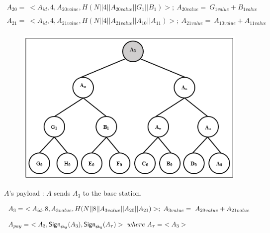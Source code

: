\documentclass[%
  slidesonly,%
  semlayer%
  ]{seminar}                                  %
\newcommand{\sk}{\sf{sk}}
\begin{document}
\begin{slide}
      \begin{tiny}
        \begin{equation*}
          \begin{array}{l}
            A_{20} =\ <A_{id},4,A_{20value},H(N||4||A_{20value}||G_{1}||B_{1})>;\ A_{20value} =\ G_{1value} + B_{1value}\\ 
            \\
            A_{21} =\ <A_{id},4,A_{21value},H(N||4||A_{21value}||A_{10}||A_{11})>;\ A_{21value} =\ A_{10value} + A_{11value}\\ 
          \end{array}
        \end{equation*}
      \end{tiny}

      \begin{figure}[h!]
        \centering
        \includegraphics[scale = 0.5]{images/a-payload.png}
      \end{figure}
      \begin{center}
        $A$'s payload : $A$ sends $A_{3}$ to the base station.
      \end{center}
      

      \begin{tiny}
      \begin{equation*}
        \begin{array}{l}
        A_{3} =\ <A_{id}, 8, A_{3value}, H(N||8||A_{3value}||A_{20}||A_{21})>;\ A_{3value} =\ A_{20value} + A_{21value}\\
        \\
        A_{pay} =\ <A_{3},\textsf{Sign}_{\sk_{A}}(A_{3}),\textsf{Sign}_{\sk_{A}}(A_{\tau})>\ where\ A_{\tau} =\ <A_{3}>
        \end{array}
      \end{equation*}
      \end{tiny}
     \vfill
     \clearpage


\end{slide}
\end{document}
